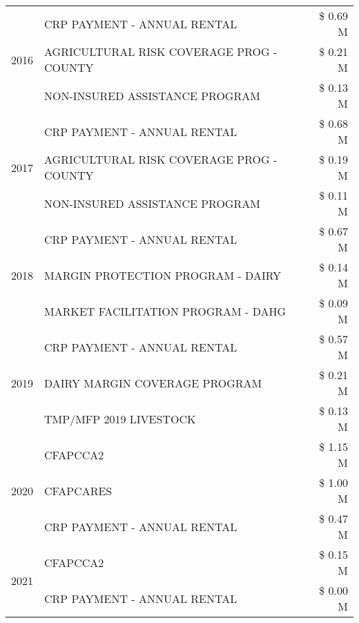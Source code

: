 \begin{tabular}{llr}
\cline{1-3}
\multirow[t]{3}{*}{2016} & CRP PAYMENT - ANNUAL RENTAL & \$ 0.69 M \\
 & AGRICULTURAL RISK COVERAGE PROG - COUNTY & \$ 0.21 M \\
 & NON-INSURED ASSISTANCE PROGRAM & \$ 0.13 M \\
\cline{1-3}
\multirow[t]{3}{*}{2017} & CRP PAYMENT - ANNUAL RENTAL & \$ 0.68 M \\
 & AGRICULTURAL RISK COVERAGE PROG - COUNTY & \$ 0.19 M \\
 & NON-INSURED ASSISTANCE PROGRAM & \$ 0.11 M \\
\cline{1-3}
\multirow[t]{3}{*}{2018} & CRP PAYMENT - ANNUAL RENTAL & \$ 0.67 M \\
 & MARGIN PROTECTION PROGRAM - DAIRY & \$ 0.14 M \\
 & MARKET FACILITATION PROGRAM - DAHG & \$ 0.09 M \\
\cline{1-3}
\multirow[t]{3}{*}{2019} & CRP PAYMENT - ANNUAL RENTAL & \$ 0.57 M \\
 & DAIRY MARGIN COVERAGE PROGRAM & \$ 0.21 M \\
 & TMP/MFP 2019 LIVESTOCK & \$ 0.13 M \\
\cline{1-3}
\multirow[t]{3}{*}{2020} & CFAPCCA2 & \$ 1.15 M \\
 & CFAPCARES & \$ 1.00 M \\
 & CRP PAYMENT - ANNUAL RENTAL & \$ 0.47 M \\
\cline{1-3}
\multirow[t]{2}{*}{2021} & CFAPCCA2 & \$ 0.15 M \\
 & CRP PAYMENT - ANNUAL RENTAL & \$ 0.00 M \\
\cline{1-3}
\bottomrule
\end{tabular}
